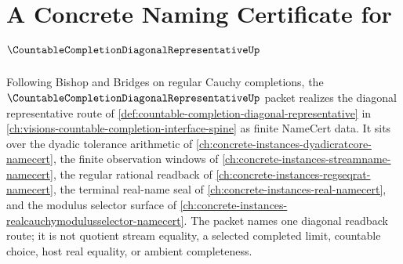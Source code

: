 \chapter{A Concrete Naming Certificate for $\CountableCompletionDiagonalRepresentativeUp$}
\label{ch:concrete-instances-countable-completion-diagonal-representative-namecert}

Following Bishop and Bridges on regular Cauchy completions, the $\CountableCompletionDiagonalRepresentativeUp$ packet realizes the diagonal representative route of \autoref{def:countable-completion-diagonal-representative} in \autoref{ch:visions-countable-completion-interface-spine} as finite NameCert data. It sits over the dyadic tolerance arithmetic of \autoref{ch:concrete-instances-dyadicratcore-namecert}, the finite observation windows of \autoref{ch:concrete-instances-streamname-namecert}, the regular rational readback of \autoref{ch:concrete-instances-regseqrat-namecert}, the terminal real-name seal of \autoref{ch:concrete-instances-real-namecert}, and the modulus selector surface of \autoref{ch:concrete-instances-realcauchymodulusselector-namecert}. The packet names one diagonal readback route; it is not quotient stream equality, a selected completed limit, countable choice, host real equality, or ambient completeness.


